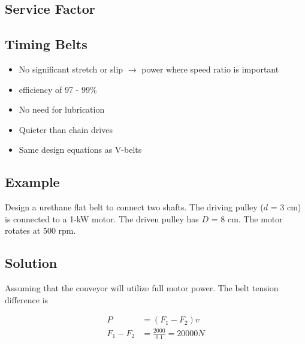 \documentclass[
10pt,
a4paper,
openany,
svgnames,
]{book}
\begin{document}
\begin{center}
\end{center}

\subsection*{Service Factor}
\label{sec:org1e458a8}

\begin{center}
\end{center}

\subsection*{Timing Belts}
\label{sec:org6ea83dd}

\begin{center}
\end{center}
\begin{itemize}
\item No significant stretch or slip \(\rightarrow\) power where speed ratio is important
\item efficiency of 97 - 99\%
\item No need for lubrication
\item Quieter than chain drives
\item Same design equations as V-belts
\end{itemize}

\subsection*{Example}
\label{sec:org851980e}

Design a urethane flat belt to connect two shafts. The driving pulley (\(d\) = 3 cm) is connected to a 1-kW motor. The driven pulley has \(D\) = 8 cm. The motor rotates at 500 rpm.

\subsection*{Solution}
\label{sec:orgf3e8b77}

Assuming that the conveyor will utilize full motor power. The belt tension difference is

\begin{align*}
    P &= \left( F_1 - F_2 \right)v \\
    F_1 - F_2 &= \frac{2000}{0.1} = 20000 N
\end{align*}
\end{document}
